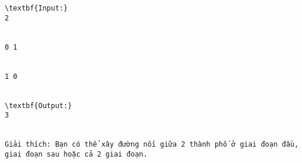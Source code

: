 \begin{verbatim}
\textbf{Input:}
2


0 1


1 0


\textbf{Output:}
3


Giải thích: Bạn có thể xây đường nối giữa 2 thành phố ở giai đoạn đầu, giai đoạn sau hoặc cả 2 giai đoạn.\end{verbatim}